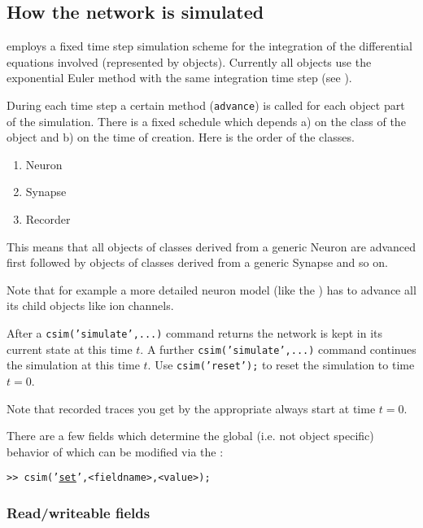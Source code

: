 \subsection{How the network is simulated}

\csim employs a fixed time step simulation scheme for the
integration of the differential equations involved (represented by
objects). Currently all objects use the exponential Euler method with
the same integration time step (see ).

During each time step a certain method (\texttt{advance}) is called
for each object part of the simulation. There is a fixed schedule
which depends a) on the class of the object and b) on the time of
creation. Here is the order of the classes.
%
\begin{enumerate}
\item Neuron
\item Synapse
\item Recorder
\end{enumerate}
%
This means that all objects of classes derived from a generic Neuron
are advanced first followed by objects of classes derived from a generic
Synapse and so on.

Note that for example a more detailed neuron model (like the
) has to advance all its child objects
like ion channels.

After a \texttt{csim('simulate',...)} command returns the network is
kept in its current state at this time $t$. A further
\texttt{csim('simulate',...)}  command continues the simulation at
this time $t$. Use \texttt{csim('reset');} to reset the simulation to
time $t=0$.

Note that recorded traces you get by the appropriate
 always start at time $t=0$.



There are a few fields which determine the global (i.e. not object
specific) behavior of \csim which can be modified via the
:
%
\begin{tabbing}
\quad\tt>> csim('\hyperlink{cmd:set}{set}',<fieldname>,<value>); \\
\end{tabbing}
%

\subsubsection*{Read/writeable fields}


